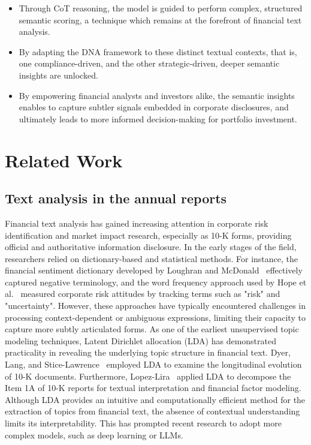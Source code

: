 \documentclass[sigconf]{acmart}
\begin{document}
\begin{itemize}
    \item Through CoT reasoning, the model is guided to perform complex, structured semantic scoring, a technique which remains at the forefront of financial text analysis.
    \item By adapting the DNA framework to these distinct textual contexts, that is, one compliance-driven, and the other strategic-driven, deeper semantic insights are unlocked. 
    \item By empowering financial analysts and investors alike, the semantic insights enables to capture subtler signals embedded in corporate disclosures, and ultimately leads to more informed decision-making for portfolio investment.
\end{itemize}

\section{Related Work}

\subsection{Text analysis in the annual reports}

Financial text analysis has gained increasing attention in corporate risk identification and market impact research, especially as 10-K forms, providing official and authoritative information disclosure. 
In the early stages of the field, researchers relied on dictionary-based and statistical methods. 
For instance, the financial sentiment dictionary developed by Loughran and McDonald~\cite{loughran2011liability} effectively captured negative terminology, and the word frequency approach used by Hope et al.~\cite{hope2016benefits} measured corporate risk attitudes by tracking terms such as "risk" and "uncertainty".
However, these approaches have typically encountered challenges in processing context-dependent or ambiguous expressions, limiting their capacity to capture more subtly articulated forms.
As one of the earliest unsupervised topic modeling techniques, Latent Dirichlet allocation (LDA) has demonstrated practicality in revealing the underlying topic structure in financial text. 
Dyer, Lang, and Stice-Lawrence~\cite{dyer2017evolution} employed LDA to examine the longitudinal evolution of 10-K documents. 
Furthermore, Lopez-Lira~\cite{lopez2023risk} applied LDA to decompose the Item 1A of 10-K reports for textual interpretation and financial factor modeling. 
Although LDA provides an intuitive and computationally efficient method for the extraction of topics from financial text, the absence of contextual understanding limits its interpretability. 
This has prompted recent research to adopt more complex models, such as deep learning or LLMs.
\end{document}
